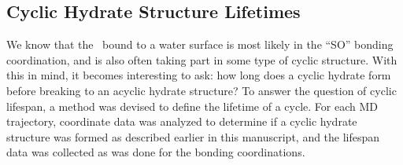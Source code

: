 \documentclass{article}
\begin{document}
\subsection {Cyclic Hydrate Structure Lifetimes}

We know that the \suldiox~bound to a water surface is most likely in the ``SO'' bonding coordination, and is also often taking part in some type of cyclic structure. With this in mind, it becomes interesting to ask: how long does a cyclic hydrate form before breaking to an acyclic hydrate structure? To answer the question of cyclic lifespan, a method was devised to define the lifetime of a cycle. For each MD trajectory, coordinate data was analyzed to determine if a cyclic hydrate structure was formed as described earlier in this manuscript, and the lifespan data was collected as was done for the bonding coordinations. %

\end{document}
